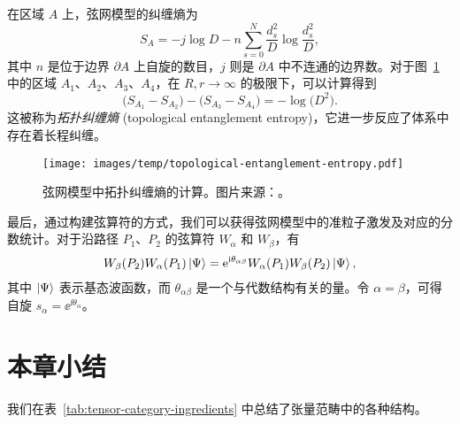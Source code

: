 在区域 $A$ 上，弦网模型的纠缠熵为\cite{levin2006detecting}
\begin{equation}
  S_A = -j \log D - n \sum_{s=0}^N \frac{d_s^2}{D} \log \frac{d_s^2}{D},
\end{equation}
其中 $n$ 是位于边界 $\partial A$ 上自旋的数目，$j$ 则是 $\partial A$ 中不连通的边界数。对于图~\ref{fig:topological-entanglement-entropy} 中的区域 $A_1$、$A_2$、$A_3$、$A_4$，在 $R,r\to\infty$ 的极限下，可以计算得到
\begin{equation}
  \bigl( S_{A_1} - S_{A_2} \bigr) - \bigl( S_{A_3} - S_{A_4} \bigr) = -\log \bigl( D^2 \bigr).
\end{equation}
这被称为\emph{拓扑纠缠熵} (topological entanglement entropy)，它进一步反应了体系中存在着长程纠缠。

\begin{figure}[htb]
  \centering
  \texttt{[image: images/temp/topological-entanglement-entropy.pdf]}
  \caption[弦网模型中拓扑纠缠熵的计算]{弦网模型中拓扑纠缠熵的计算。图片来源：\parencite{levin2006detecting}。}
  \label{fig:topological-entanglement-entropy}
\end{figure}

最后，通过构建弦算符的方式，我们可以获得弦网模型中的准粒子激发及对应的分数统计\cite{levin2005string,lin2014generalizations}。对于沿路径 $P_1$、$P_2$ 的弦算符 $W_\alpha$ 和 $W_\beta$，有
\begin{equation}
  W_\beta(P_2) W_\alpha(P_1) \ket{\Psi} = \ee^{\ii\theta_{\alpha\beta}} W_\alpha(P_1) W_\beta(P_2) \ket{\Psi},
\end{equation}
其中 $\ket{\Psi}$ 表示基态波函数，而 $\theta_{\alpha\beta}$ 是一个与代数结构有关的量。令 $\alpha=\beta$，可得自旋 $s_\alpha=\ee^{\ii\theta_\alpha}$。

\section{本章小结}

我们在表~\ref{tab:tensor-category-ingredients} 中总结了张量范畴中的各种结构。

